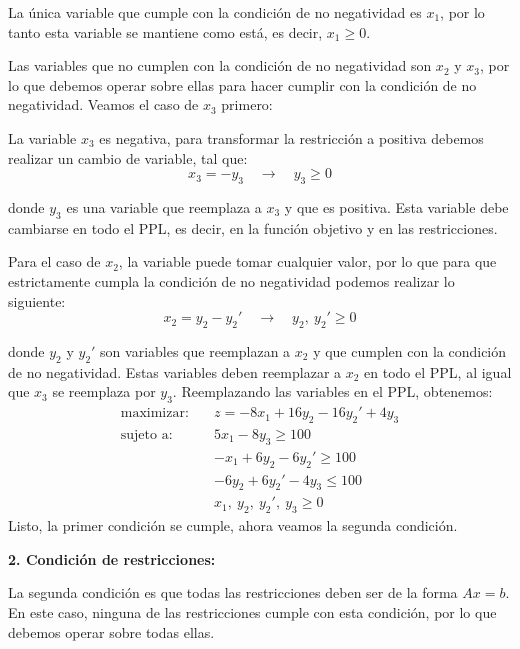 La única variable que cumple con la condición de no negatividad es \(x_1\), por lo tanto esta variable se mantiene como está, es decir, \(x_1 \geq 0\). 

Las variables que no cumplen con la condición de no negatividad son \(x_2\) y \(x_3\), por lo que debemos operar sobre ellas para hacer cumplir con la condición de no negatividad. Veamos el caso de \(x_3\) primero: 

La variable \(x_3\) es negativa, para transformar la restricción a positiva debemos realizar un cambio de variable, tal que:
\[
  x_3 = -y_3 \quad \rightarrow \quad y_3 \geq 0
\]

\noindent donde \(y_3\) es una variable que reemplaza a \(x_3\) y que es positiva. Esta variable debe cambiarse en todo el PPL, es decir, en la función objetivo y en las restricciones. 

Para el caso de \(x_2\), la variable puede tomar cualquier valor, por lo que para que estrictamente cumpla la condición de no negatividad podemos realizar lo siguiente:
\[
  x_2 = y_2 - y_2' \quad \rightarrow \quad y_2,\ y_2' \geq 0
\]

\noindent donde \(y_2\) y \(y_2'\) son variables que reemplazan a \(x_2\) y que cumplen con la condición de no negatividad. Estas variables deben reemplazar a \(x_2\) en todo el PPL, al igual que \(x_3\) se reemplaza por \(y_3\). Reemplazando las variables en el PPL, obtenemos:
\begin{align*}
  \text{maximizar:} \quad   &z = -8x_1 + 16y_2 - 16y_2' + 4y_3 \\[3pt]
  \text{sujeto a:} \quad    &5x_1 - 8y_3 \geq 100 \\
                            &-x_1 + 6y_2 - 6y_2' \geq 100 \\
                            &-6y_2 + 6y_2' - 4y_3 \leq 100 \\
                            &x_1,\ y_2,\ y_2',\ y_3 \geq 0
\end{align*}
Listo, la primer condición se cumple, ahora veamos la segunda condición.

\noindent\textbf{2. Condición de restricciones:}

La segunda condición es que todas las restricciones deben ser de la forma \(Ax = b\). En este caso, ninguna de las restricciones cumple con esta condición, por lo que debemos operar sobre todas ellas. 

